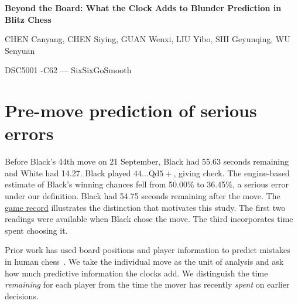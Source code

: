 \documentclass[10pt,a4paper]{article}
\newcommand{\reporttitle}{Beyond the Board: What the Clock Adds to Blunder Prediction in Blitz Chess}
\begin{document}
{\centering
\parbox{.68\linewidth}{\centering\LARGE\bfseries\reporttitle\par}\par
\vspace{4pt}
{\normalsize CHEN Canyang, CHEN Siying, GUAN Wenxi, LIU Yibo, SHI Geyunqing, WU Senyuan\par}
{\normalsize DSC5001 -C62 --- SixSixGoSmooth\par}
}
\vspace{3pt}

\begin{abstract}\noindent
We estimate how much pre-move clock readings improve the prediction of serious errors in blitz chess after accounting for board position and player ratings. We analysed \VerifiedMoves{} moves from \VerifiedGames{} three-minute Lichess games without increments. In the archived dataset, the field labelled as the opponent's clock recorded the mover's remaining time \emph{after} the move. We reconstructed both pre-move clocks and refitted the same model with three nested sets of predictors. During the previously evaluated final week of September, adding both clocks reduced log loss from \BoardOnlyTest{} to \ClocksOnlyTest{}. Adding the mover's recent time use reduced it further to \SelectedTest{}. The combined reduction was 0.43\% relative to the position-and-ratings baseline. Most of this modest gain came from the two pre-move clocks.
\par\smallskip\noindent\textbf{Keywords}\quad Blitz chess,\hfill time pressure,\hfill probabilistic prediction,\hfill gradient boosting,\hfill probability calibration
\end{abstract}

\section{Pre-move prediction of serious errors}
Before Black's 44th move on 21 September, Black had 55.63 seconds remaining and White had 14.27. Black played \(44\ldots\mathrm{Qd5+}\), giving check. The engine-based estimate of Black's winning chances fell from 50.00\% to 36.45\%, a serious error under our definition. Black had 54.75 seconds remaining after the move. The \href{https://lichess.org/FFkB7LoP/black#87}{game record} illustrates the distinction that motivates this study. The first two readings were available when Black chose the move. The third incorporates time spent choosing it.

Prior work has used board positions and player information to predict mistakes in human chess~\cite{maia}. We take the individual move as the unit of analysis and ask how much predictive information the clocks add. We distinguish the time \emph{remaining} for each player from the time the mover has recently \emph{spent} on earlier decisions.
\end{document}
